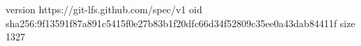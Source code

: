 version https://git-lfs.github.com/spec/v1
oid sha256:9f13591f87a891c5415f0e27b83b1f20dfc66d34f52809c35ee0a43dab84411f
size 1327
